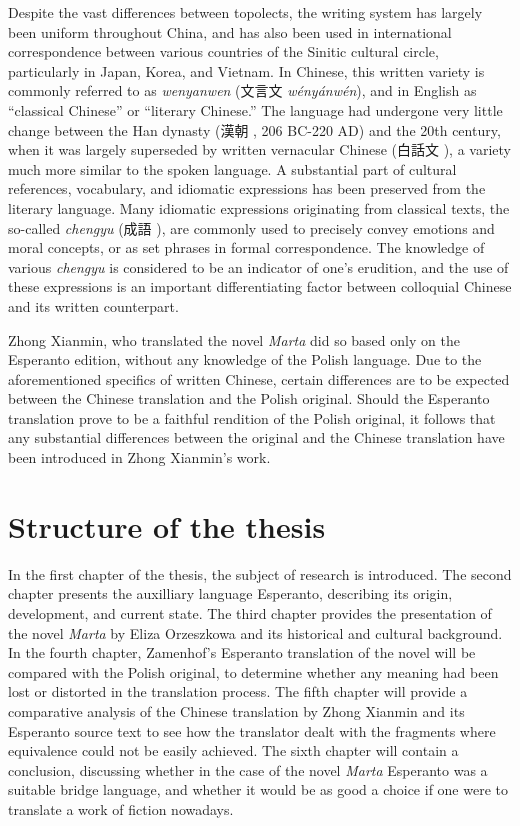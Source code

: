 Despite the vast differences between topolects, the writing system has largely been uniform throughout China, and has also been used in international correspondence between various countries of the Sinitic cultural circle, particularly in Japan, Korea, and Vietnam.
In Chinese, this written variety is commonly referred to as \textit{wenyanwen} (文言文 \textit{wényánwén}), and in English as ``classical Chinese'' or ``literary Chinese.''
The language had undergone very little change between the Han dynasty (漢朝 , 206 BC-220 AD) and the 20th century, when it was largely superseded by written vernacular Chinese (白話文 ), a variety much more similar to the spoken language.
A substantial part of cultural references, vocabulary, and idiomatic expressions has been preserved from the literary language.
Many idiomatic expressions originating from classical texts, the so-called \textit{chengyu} (成語 ), are commonly used to precisely convey emotions and moral concepts, or as set phrases in formal correspondence.
The knowledge of various \textit{chengyu} is considered to be an indicator of one's erudition, and the use of these expressions is an important differentiating factor between colloquial Chinese and its written counterpart.

Zhong Xianmin, who translated the novel \textit{Marta} did so based only on the Esperanto edition, without any knowledge of the Polish language.
Due to the aforementioned specifics of written Chinese, certain differences are to be expected between the Chinese translation and the Polish original.
Should the Esperanto translation prove to be a faithful rendition of the Polish original, it follows that any substantial differences between the original and the Chinese translation have been introduced in Zhong Xianmin's work.

\section{Structure of the thesis}
In the first chapter of the thesis, the subject of research is introduced.
The second chapter presents the auxilliary language Esperanto, describing its origin, development, and current state.
The third chapter provides the presentation of the novel \textit{Marta} by Eliza Orzeszkowa and its historical and cultural background.
In the fourth chapter, Zamenhof's Esperanto translation of the novel will be compared with the Polish original, to determine whether any meaning had been lost or distorted in the translation process.
The fifth chapter will provide a comparative analysis of the Chinese translation by Zhong Xianmin and its Esperanto source text to see how the translator dealt with the fragments where equivalence could not be easily achieved.
The sixth chapter will contain a conclusion, discussing whether in the case of the novel \textit{Marta} Esperanto was a suitable bridge language, and whether it would be as good a choice if one were to translate a work of fiction nowadays.
